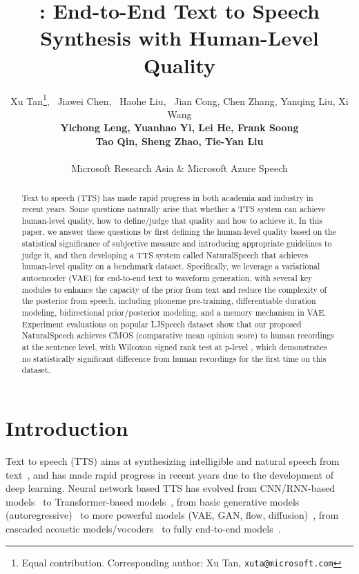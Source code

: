 \documentclass{article}
\title{\textit{\myname{}}: End-to-End Text to Speech Synthesis with Human-Level Quality}
\author{
Xu Tan\thanks{Equal contribution. Corresponding author: Xu Tan, \texttt{xuta@microsoft.com}}, ~Jiawei Chen\footnotemark[1], ~Haohe Liu\footnotemark[1], ~Jian Cong, Chen Zhang, Yanqing Liu, Xi Wang  \\
\textbf{Yichong Leng, Yuanhao Yi, Lei He, Frank Soong} \\  
\textbf{Tao Qin, Sheng Zhao, Tie-Yan Liu}  \\
\\
Microsoft Research Asia \& Microsoft Azure Speech \\
}
\theoremstyle{definition}
\def\myname{NaturalSpeech}
\begin{document}
\maketitle

\begin{abstract}
Text to speech (TTS) has made rapid progress in both academia and industry in recent years. Some questions naturally arise that whether a TTS system can achieve human-level quality, how to define/judge that quality and how to achieve it. In this paper, we answer these questions by first defining the human-level quality based on the statistical significance of subjective measure and introducing appropriate guidelines to judge it, and then developing a TTS system called \myname{} that achieves human-level quality on a benchmark dataset. Specifically, we leverage a variational autoencoder (VAE) for end-to-end text to waveform generation, with several key modules to enhance the capacity of the prior from text and reduce the complexity of the posterior from speech, including phoneme pre-training, differentiable duration modeling, bidirectional prior/posterior modeling, and a memory mechanism in VAE. Experiment evaluations on popular LJSpeech dataset show that our proposed \myname{} achieves  CMOS (comparative mean opinion score) to human recordings at the sentence level, with Wilcoxon signed rank test at p-level , which demonstrates no statistically significant difference from human recordings for the first time on this dataset. 

\end{abstract}


\section{Introduction}

Text to speech (TTS) aims at synthesizing intelligible and natural speech from text~\cite{tan2021survey}, and has made rapid progress in recent years due to the development of deep learning. Neural network based TTS has evolved from CNN/RNN-based models~\cite{oord2016wavenet,shen2018natural,wang2017tacotron,arik2017deep,gibiansky2017deep,ping2018deep,tachibana2018efficiently} to Transformer-based models~\cite{li2019neural,ren2019fastspeech,liu2021delightfultts}, from basic generative models (autoregressive)~\cite{oord2016wavenet,shen2018natural,li2019neural} to more powerful models (VAE, GAN, flow, diffusion)~\cite{prenger2019waveglow,kim2020glow,popov2021grad,kim2021conditional}, from cascaded acoustic models/vocoders~\cite{oord2016wavenet,wang2017tacotron,shen2018natural,ren2019fastspeech,kalchbrenner2018efficient,kong2020hifi} to fully end-to-end models~\cite{ren2021fastspeech,donahue2020end,kim2021conditional}.
\end{document}
